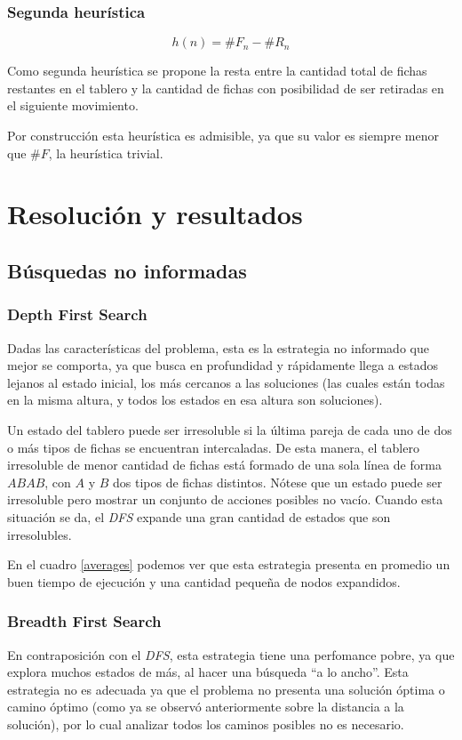 \documentclass[a4paper,10pt]{article}
\begin{document}
\begin{itemize}
    \subsubsection{Segunda heurística}

    \[ h(n) = \# F_n - \# R_n\] 

    Como segunda heurística se propone la resta entre la cantidad total de fichas restantes en el tablero y la cantidad de fichas con posibilidad de ser retiradas en el siguiente movimiento.

    Por construcción esta heurística es admisible, ya que su valor es siempre menor que $\#F$, la heurística trivial.

\section{Resolución y resultados}

\subsection{Búsquedas no informadas}

    \subsubsection{Depth First Search}
    \label{sec:dfs}
    Dadas las características del problema, esta es la estrategia no informado que mejor se comporta, ya que busca en profundidad y rápidamente llega a estados lejanos al estado inicial, los más cercanos a las soluciones (las cuales están todas en la misma altura, y todos los estados en esa altura son soluciones).

    Un estado del tablero puede ser irresoluble si la última pareja de cada uno de dos o más tipos de fichas se encuentran intercaladas. De esta manera, el tablero irresoluble de menor cantidad de fichas está formado de una sola línea de forma $ABAB$, con $A$ y $B$ dos tipos de fichas distintos. Nótese que un estado puede ser irresoluble pero mostrar un conjunto de acciones posibles no vacío. Cuando esta situación se da, el \textit{DFS} expande una gran cantidad de estados que son irresolubles.

    En el cuadro \ref{averages} podemos ver que esta estrategia presenta en promedio un buen tiempo de ejecución y una cantidad pequeña de nodos expandidos.
    
    \subsubsection{Breadth First Search}
    En contraposición con el \textit{DFS}, esta estrategia tiene una perfomance pobre, ya que explora muchos estados de más, al hacer una búsqueda ``a lo ancho''. Esta estrategia no es adecuada ya que el problema no presenta una solución óptima o camino óptimo (como ya se observó anteriormente sobre la distancia a la solución), por lo cual analizar todos los caminos posibles no es necesario.


\end{itemize}
\end{document}
